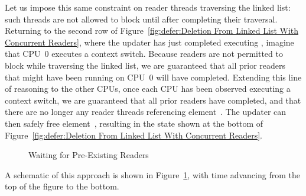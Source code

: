 Let us impose this same constraint on reader threads traversing the
linked list: such threads are not allowed to block until after
completing their traversal.
Returning to the second row of
Figure~\ref{fig:defer:Deletion From Linked List With Concurrent Readers},
where the updater has just completed executing ,
imagine that CPU~0 executes a context switch.
Because readers are not permitted to block while traversing the linked
list, we are guaranteed that all prior readers that might have been running on
CPU~0 will have completed.
Extending this line of reasoning to the other CPUs, once each CPU has
been observed executing a context switch, we are guaranteed that all
prior readers have completed, and that there are no longer any reader
threads referencing element~.
The updater can then safely free element~, resulting in the
state shown at the bottom of
Figure~\ref{fig:defer:Deletion From Linked List With Concurrent Readers}.

\begin{figure}[tb]
\centering
{}
\caption{Waiting for Pre-Existing Readers}
\label{fig:defer:Waiting for Pre-Existing Readers}
\end{figure}

A schematic of this approach is shown in
Figure~\ref{fig:defer:Waiting for Pre-Existing Readers},
with time advancing from the top of the figure to the bottom.

